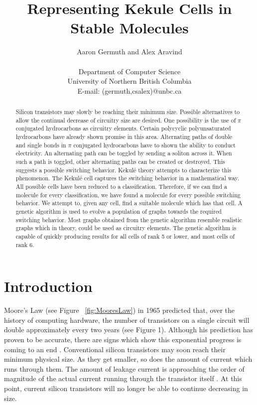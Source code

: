 \documentclass[12pt]{article}
\begin{document}
\title{Representing Kekule Cells in Stable Molecules}
\author{Aaron Germuth and Alex Aravind \\\\  
Department of Computer Science \\
University of Northern British Columbia \\
E-mail: (germuth,csalex)@unbc.ca}
\maketitle


\begin{abstract}

Silicon transistors may slowly be reaching their minimum size. Possible alternatives to allow the continual decrease of circuitry size are desired. One possibility is the use of $\pi$ conjugated hydrocarbons as circuitry elements.  Certain polycyclic polyunsaturated hydrocarbons have already shown promise in this area. Alternating paths of double and single bonds in $\pi$ conjugated hydrocarbons have to shown the ability to conduct electricity. An alternating path can be toggled by sending a soliton across it. When such a path is toggled, other alternating paths can be created or destroyed. This suggests a possible switching behavior. Kekul\'e theory attempts to characterize this phenomenon. The Kekul\'e cell captures the switching behavior in a mathematical way. All possible cells have been reduced to a classification. Therefore, if we can find a molecule for every classification, we have found a molecule for every possible switching behavior. We attempt to, given any cell, find a suitable molecule which has that cell. A genetic algorithm is used to evolve a population of graphs towards the required switching behavior. Most graphs obtained from the genetic algorithm resemble realistic graphs which in theory, could be used as circuitry elements. The genetic algorithm is capable of quickly producing results for all cells of rank 5 or lower, and most cells of rank 6.

\end{abstract}

\section{Introduction}

Moore's Law (see Figure ~\ref{fig:MooresLaw}) in 1965 \cite{Moore} predicted that, over the history of computing hardware, the number of transistors on a single circuit will double approximately every two years (see Figure 1). Although his prediction has proven to be accurate, there are signs which show this exponential progress is coming to an end \cite{MooreEnd}. Conventional silicon transistors may soon reach their minimum physical size. As they get smaller, so does the amount of current which runs through them. The amount of leakage current is approaching the order of magnitude of the actual current running through the transistor itself \cite{v06}. At this point, current silicon transistors will no longer be able to continue decreasing in size.
\end{document}

